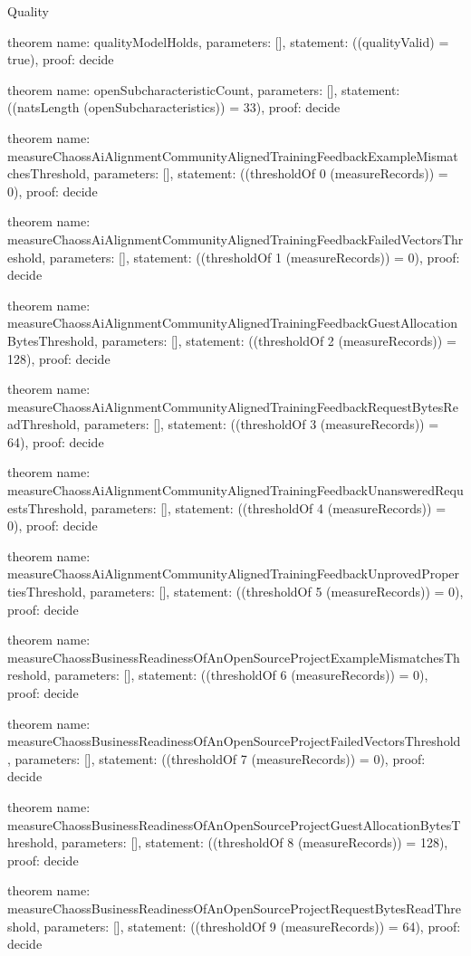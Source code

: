 \begin{lexlean}{Quality}
\begin{semanticmodule}
theorem{
  name: qualityModelHolds,
  parameters: [],
  statement: ((qualityValid) = true),
  proof: decide{}
}

theorem{
  name: openSubcharacteristicCount,
  parameters: [],
  statement: ((natsLength (openSubcharacteristics)) = 33),
  proof: decide{}
}

theorem{
  name: measureChaossAiAlignmentCommunityAlignedTrainingFeedbackExampleMismatchesThreshold,
  parameters: [],
  statement: ((thresholdOf 0 (measureRecords)) = 0),
  proof: decide{}
}

theorem{
  name: measureChaossAiAlignmentCommunityAlignedTrainingFeedbackFailedVectorsThreshold,
  parameters: [],
  statement: ((thresholdOf 1 (measureRecords)) = 0),
  proof: decide{}
}

theorem{
  name: measureChaossAiAlignmentCommunityAlignedTrainingFeedbackGuestAllocationBytesThreshold,
  parameters: [],
  statement: ((thresholdOf 2 (measureRecords)) = 128),
  proof: decide{}
}

theorem{
  name: measureChaossAiAlignmentCommunityAlignedTrainingFeedbackRequestBytesReadThreshold,
  parameters: [],
  statement: ((thresholdOf 3 (measureRecords)) = 64),
  proof: decide{}
}

theorem{
  name: measureChaossAiAlignmentCommunityAlignedTrainingFeedbackUnansweredRequestsThreshold,
  parameters: [],
  statement: ((thresholdOf 4 (measureRecords)) = 0),
  proof: decide{}
}

theorem{
  name: measureChaossAiAlignmentCommunityAlignedTrainingFeedbackUnprovedPropertiesThreshold,
  parameters: [],
  statement: ((thresholdOf 5 (measureRecords)) = 0),
  proof: decide{}
}

theorem{
  name: measureChaossBusinessReadinessOfAnOpenSourceProjectExampleMismatchesThreshold,
  parameters: [],
  statement: ((thresholdOf 6 (measureRecords)) = 0),
  proof: decide{}
}

theorem{
  name: measureChaossBusinessReadinessOfAnOpenSourceProjectFailedVectorsThreshold,
  parameters: [],
  statement: ((thresholdOf 7 (measureRecords)) = 0),
  proof: decide{}
}

theorem{
  name: measureChaossBusinessReadinessOfAnOpenSourceProjectGuestAllocationBytesThreshold,
  parameters: [],
  statement: ((thresholdOf 8 (measureRecords)) = 128),
  proof: decide{}
}

theorem{
  name: measureChaossBusinessReadinessOfAnOpenSourceProjectRequestBytesReadThreshold,
  parameters: [],
  statement: ((thresholdOf 9 (measureRecords)) = 64),
  proof: decide{}
}


\end{semanticmodule}
\end{lexlean}
